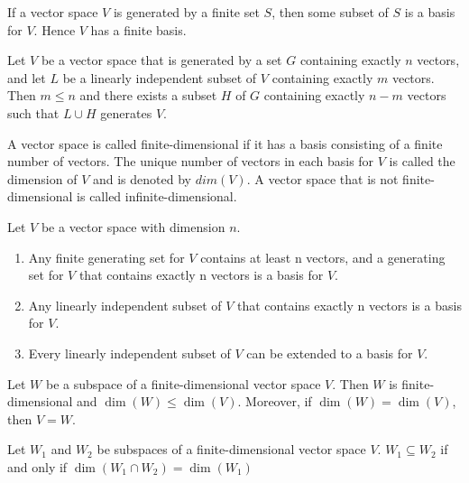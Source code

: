 \begin{thm}
	If a vector space $V$ is generated by a finite set $S$, then some subset of $S$ is a basis for $V$. Hence $V$ has a finite basis.	
\end{thm}

\begin{thm}
	Let $V$ be a vector space that is generated by a set $G$ containing exactly $n$ vectors, and let $L$ be a linearly independent subset of $V$ containing exactly $m$ vectors. Then $m \leq n$ and there exists a subset $H$ of $G$ containing exactly $n - m$ vectors such that $L \cup H$ generates $V$.
\end{thm}

\begin{defn}
	A vector space is called finite-dimensional if it has a basis consisting of a finite number of vectors. The unique number of vectors
 in each basis for $V$ is called the dimension of $V$ and is denoted by $dim(V)$.
A vector space that is not finite-dimensional is called infinite-dimensional.
\end{defn}


\begin{cor}
	Let $V$ be a vector space with dimension $n$.
	\begin{enumerate}
		\item Any finite generating set for $V$ contains at least n vectors, and a generating set for $V$ that contains exactly n vectors is a basis for $V$.
		\item Any linearly independent subset of $V$ that contains exactly n vectors is a basis for $V$.
		\item Every linearly independent subset of $V$ can be extended to a basis for $V$.
	\end{enumerate}
\end{cor}


\begin{thm}
Let $W$ be a subspace of a finite-dimensional vector space $V$. Then $W$ is finite-dimensional and $\dim(W) \leq \dim(V)$. Moreover, if $\dim(W) = \dim(V)$, then $V = W$.
\end{thm}

\begin{prop}
	Let $W_1$ and $W_2$ be subspaces of a finite-dimensional vector space $V$. $W_1 \subseteq W_2$ if and only if $\dim(W_1 \cap W_2) = \dim(W_1)$
\end{prop}

